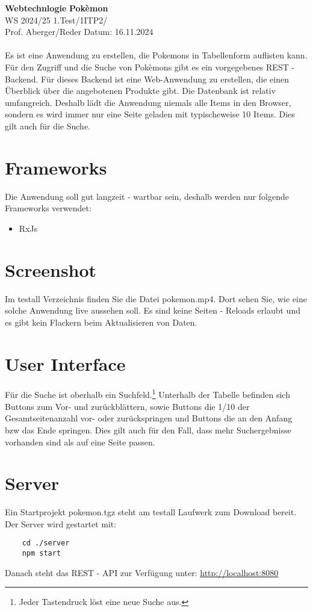 \documentclass[a4paper, 11pt]{article}
\begin{document}
\noindent
\large\textbf{Webtechnlogie} \hfill \textbf{Pokèmon} \\
\normalsize WS 2024/25 \hfill 1.Test/1ITP2/\\
Prof. Aberger/Reder \hfill Datum: 16.11.2024\\
\\

\abstract{}
Es ist eine Anwendung zu erstellen, die Pokemons in Tabellenform auflisten kann.
Für den Zugriff und die Suche von Pokèmons gibt es ein vorgegebenes REST - Backend.
Für dieses Backend ist eine Web-Anwendung zu erstellen, die einen Überblick über die angebotenen Produkte gibt.
Die Datenbank ist relativ umfangreich. Deshalb lädt die Anwendung niemals alle Items in den Browser,
sondern es wird immer nur eine Seite geladen mit typischeweise 10 Items. Dies gilt auch für die Suche.

\section{Frameworks}

Die Anwendung soll gut langzeit - wartbar sein, deshalb werden nur folgende Frameworks verwendet:
\begin{itemize}
	\item RxJs
\end{itemize}


\section{Screenshot}

Im testall Verzeichnis finden Sie die Datei pokemon.mp4. Dort sehen Sie, wie eine solche Anwendung live aussehen soll. Es sind keine Seiten - Reloads erlaubt und
es gibt kein Flackern beim Aktualisieren von Daten.

\section{User Interface}
Für die Suche ist oberhalb ein Suchfeld.\footnote{Jeder Tastendruck löst eine neue Suche aus.}
Unterhalb der Tabelle befinden sich Buttons zum Vor- und zurückblättern, sowie Buttons die 1/10 der Gesamtseitenanzahl vor- oder zurückspringen
und Buttons die an den Anfang bzw das Ende springen. Dies gilt auch für den Fall, dass mehr Suchergebnisse 
vorhanden sind als auf eine Seite passen.

\section{Server}
Ein Startprojekt pokemon.tgz steht am testall Laufwerk zum Download bereit. 
Der Server wird gestartet mit:
\begin{verbatim}
	cd ./server
	npm start
\end{verbatim}
Danach steht das REST - API zur Verfügung unter:
\href{http://localhost:8080}{http://localhost:8080}
\end{document}
